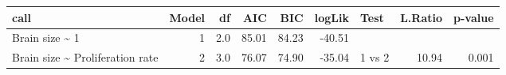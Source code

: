 \begin{table}[ht]
\centering
\begin{tabular}{lrrrrrlrr}
  \hline
call & Model & df & AIC & BIC & logLik & Test & L.Ratio & p-value \\ 
  \hline
Brain size \~{} 1 &  1 & 2.0 & 85.01 & 84.23 & -40.51 &  &  &  \\ 
  Brain size \~{} Proliferation rate &  2 & 3.0 & 76.07 & 74.90 & -35.04 & 1 vs 2 & 10.94 & 0.001 \\ 
   \hline
\end{tabular}
\end{table}
